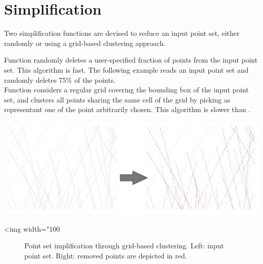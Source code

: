 \section{Simplification}

Two simplification functions are devised to reduce an input point set, either randomly or using a grid-based clustering approach. 

Function  randomly deletes a user-specified fraction of points from the input point set. This algorithm is fast. The following example reads an input point set and randomly deletes 75\% of the points.
  \\

Function  considers a regular grid covering the bounding box of the input point set, and clusters all points sharing the same cell of the grid by picking as representant one of the point arbitrarily chosen. This algorithm is slower than .
  \\

\begin{center}
    \label{Point_set_processing_3-fig-merge_simplification}
    \begin{ccTexOnly}
        \includegraphics[width=1.0\textwidth]{Point_set_processing_3/merge_simplification} %
    \end{ccTexOnly}
    \begin{ccHtmlOnly}
        <img width="100%
    \end{ccHtmlOnly}
    \begin{figure}[h]
        \caption{Point set implification through grid-based clustering.
                 Left: input point set.
                 Right: removed points are depicted in red.}
    \end{figure}
\end{center}



